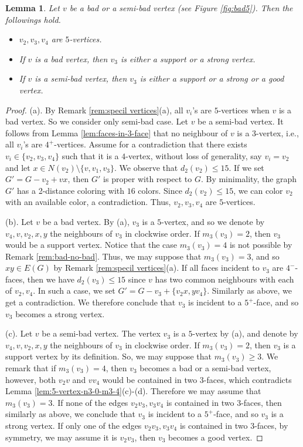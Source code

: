 \documentclass[12pt, reqno]{amsart}
\theoremstyle{plain}
\newtheorem{lemma}[equation]{Lemma}
\theoremstyle{definition}
\numberwithin{equation}{section}
\begin{document}
\begin{lemma}\label{lem:deger}
Let $v$ be a bad or a semi-bad vertex (see Figure \ref{fig:bad5}). Then the followings hold.
\begin{itemize}
\item[$(a)$] $v_2,v_3,v_4$ are $5$-vertices.
\item[$(b)$] If $v$ is a bad vertex, then $v_3$ is either a support or a strong vertex.
\item[$(c)$] If $v$ is a semi-bad vertex, then $v_3$ is  either a support or a strong or a good vertex.
\end{itemize}
\end{lemma}
\begin{proof} 
(a). By Remark \ref{rem:specil vertices}(a), all $v_i$'s are $5$-vertices when $v$ is a bad vertex. So we consider only semi-bad case. Let $v$ be a semi-bad vertex. It follows from Lemma \ref{lem:faces-in-3-face} that no neighbour of $v$ is a $3$-vertex, i.e., all $v_i$'s  are $4^+$-vertices. Assume for a contradiction that there exists $v_i \in \{v_2,v_3,v_4\}$ such that it is a $4$-vertex, without loss of generality, say $v_i=v_2$ and let $x\in N(v_2)\setminus \{v,v_1,v_3\}$. We observe that $d_2(v_2)\leq 15$. If we set $G'=G-v_2+vx$, then  $G'$ is proper with respect to $G$. By minimality, the graph $G'$ has a 2-distance coloring with $16$ colors. Since $d_2(v_2)\leq 15$, we can color $v_2$ with an available color, a contradiction. Thus, $v_2,v_3,v_4$ are $5$-vertices.

(b). Let $v$ be a bad vertex. By (a), $v_3$ is a $5$-vertex, and so we denote by $v_4,v,v_2,x,y$  the neighbours of $v_3$ in clockwise order.  If $m_3(v_3)=2$, then $v_3$ would be a support vertex. Notice that the case $m_3(v_3)=4$ is not possible by Remark \ref{rem:bad-no-bad}.  Thus, we may suppose that $m_3(v_3)=3$, and so $xy\in E(G)$ by Remark \ref{rem:specil vertices}(a). %
If all faces incident to $v_3$ are $4^-$-faces, then we have $d_2(v_3)\leq 15$ since $v$ has two common neighbours with each of $v_2,v_4$. In such a case, we set $G'=G-v_3+\{v_2x,yv_4\}$.  Similarly as above, we get a contradiction. We therefore conclude that $v_3$ is incident to a $5^+$-face, and so $v_3$ becomes a strong vertex.

(c). Let $v$ be a semi-bad vertex. The vertex $v_3$ is a $5$-vertex by (a), and denote by $v_4,v,v_2,x,y$ the neighbours of $v_3$ in clockwise order.  If $m_3(v_3)=2$, then $v_3$ is a support vertex by its definition. So, we may suppose that $m_3(v_3)\geq 3$. We remark that if $m_3(v_3)=4$, then $v_3$ becomes a bad or a semi-bad vertex, however, both $v_2v$ and $vv_4$ would be contained in two $3$-faces, which contradicts Lemma \ref{lem:5-vertex-n3-0-m3-4}(c)-(d). Therefore we may assume that  $m_3(v_3)= 3$. If none of the edges $v_2v_3, v_3v_4$ is contained in two $3$-faces, then similarly as above, we conclude that $v_3$ is incident to a $5^+$-face, and so $v_3$ is a strong vertex.
If only one of the edges $v_2v_3, v_3v_4$ is contained in two $3$-faces, by symmetry, we may assume it is $v_2v_3$, then $v_3$ becomes a good vertex. \medskip
\end{proof}
\end{document}
